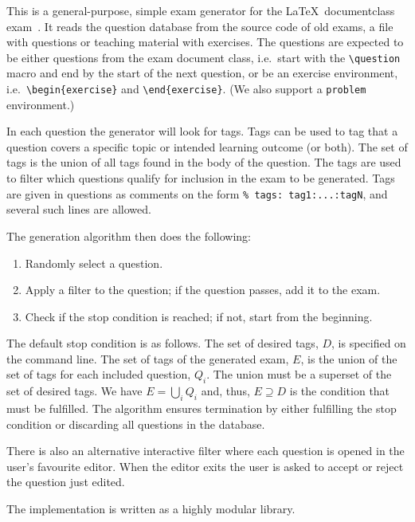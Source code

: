 This is a general-purpose, simple exam generator for the \LaTeX\ documentclass 
exam~\cite{exam}.
It reads the question database from the source code of old exams, a file with 
questions or teaching material with exercises.
The questions are expected to be either questions from the exam document class, 
i.e.\ start with the
\verb'\question'
macro and end by the start of the next question, or be an exercise environment,
i.e.\ \verb'\begin{exercise}'
and
\verb'\end{exercise}'.
(We also support a \verb'problem' environment.)

In each question the generator will look for tags.
Tags can be used to tag that a question covers a specific topic or intended 
learning outcome (or both).
The set of tags is the union of all tags found in the body of the question.
The tags are used to filter which questions qualify for inclusion in the exam 
to be generated.
Tags are given in questions as comments on the form
\verb'% tags: tag1:...:tagN',
and several such lines are allowed.

The generation algorithm then does the following:
\begin{enumerate}
\item Randomly select a question.
\item Apply a filter to the question; if the question passes, add it to the 
exam.
\item Check if the stop condition is reached; if not, start from the beginning.
\end{enumerate}
The default stop condition is as follows.
The set of desired tags, \(D\), is specified on the command line.
The set of tags of the generated exam, \(E\), is the union of the set of tags 
for each included question, \(Q_i\).
The union must be a superset of the set of desired tags.
We have \(E = \bigcup_i Q_i\) and, thus, \(E\supseteq D\) is the condition that 
must be fulfilled.
The algorithm ensures termination by either fulfilling the stop condition or 
discarding all questions in the database.

There is also an alternative interactive filter where each question is opened 
in the user's favourite editor.
When the editor exits the user is asked to accept or reject the question just 
edited.

The implementation is written as a highly modular library.
